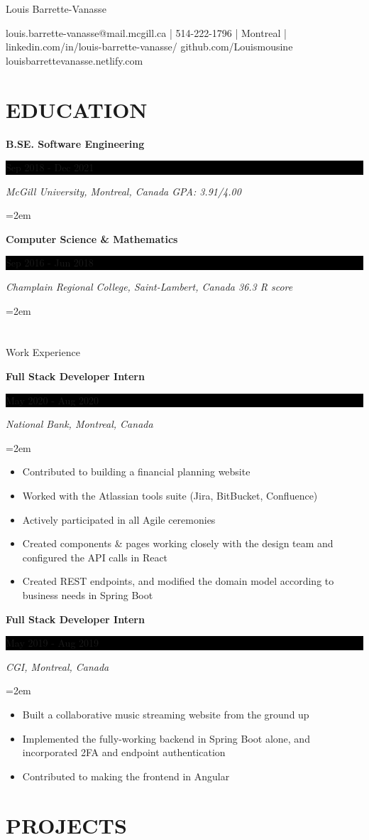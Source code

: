 \documentclass[fontsize=11pt]{article}
\newcommand{\sepspace}{\vspace*{1em}}   %
\newcommand{\MyName}[1]{ %
    \Huge \usefont{OT1}{phv}{b}{n} \hfill #1
    \par \normalsize \normalfont}
\newcommand{\NewPart}[1]{\section*{\uppercase{#1}}}
\newcommand{\EducationEntry}[4]{
    \noindent \textbf{#1} \hfill      %
    \colorbox{Black}{
      \parbox{8.5em}{
      \hfill\color{White}#2}} \par  %
    \noindent \textit{#3} \par        %
    \noindent\hangindent=2em\hangafter=0 \small #4 %
    \normalsize \par}
\newcommand{\WorkEntry}[4]{       %
    \noindent \textbf{#1} \hfill      %
    \colorbox{Black}{%
      \parbox{9em}{%
      \hfill\color{White}#2}} \par   %
        \noindent \textit{#3} \par        %
    \noindent\hangindent=2em\hangafter=0 \small #4 %
    \normalsize \par}
\begin{document}
    
\MyName{Louis Barrette-Vanasse}
\bigskip
{\small \hfill louis.barrette-vanasse@mail.mcgill.ca | 514-222-1796 | Montreal | linkedin.com/in/louis-barrette-vanasse/\textbar{} github.com/Louismousine \textbar{} louisbarrettevanasse.netlify.com}
\NewPart{Education}{}
\EducationEntry
{B.SE. Software Engineering}
{Sep 2018 - Dec 2021}
{McGill University, \textbar{} Montreal, Canada \textbar{} GPA: 3.91/4.00}
\sepspace
\EducationEntry
{Computer Science \& Mathematics}
{Sep 2016 - Jun 2018}
{Champlain Regional College, Saint-Lambert, Canada 36.3 R score}

\NewPart{Work Experience}{}

\WorkEntry
{Full Stack Developer Intern}
{May 2020 - Aug 2020}
{National Bank, Montreal, Canada}
{\begin{itemize} \itemsep -1pt
	\item Contributed to building a financial planning website
	\item Worked with the Atlassian tools suite (Jira, BitBucket, Confluence)
	\item Actively participated in all Agile ceremonies
	\item Created components \& pages working closely with the design team and configured the API calls in React
	\item Created REST endpoints, and modified the domain model according to business needs in Spring Boot
	\end{itemize}}
\sepspace
\WorkEntry
{Full Stack Developer Intern}
{May 2019 - Aug 2019}
{CGI, Montreal, Canada}
{\begin{itemize} \itemsep -1pt
	\item Built a collaborative music streaming website from the ground up
	\item Implemented the fully-working backend in Spring Boot alone, and incorporated 2FA and endpoint authentication
	\item Contributed to making the frontend in Angular
	\end{itemize}}
\NewPart{Projects}{}
\end{document}
